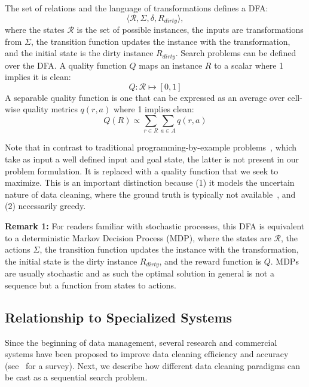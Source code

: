 The set of relations and the language of transformations defines a DFA:
\[\langle \mathcal{R}, \Sigma, \delta, R_{dirty}\rangle, \]
where the states $\mathcal{R}$ is the set of possible instances, the inputs are transformations from $\Sigma$, the transition function updates the instance with the transformation, and the initial state is the dirty instance $R_{dirty}$. Search problems can be defined over the DFA. 
A quality function $Q$ maps an instance $R$ to a scalar where 1 implies it is clean:
\[
Q: \mathcal{R} \mapsto [0,1]
\]
A separable quality function is one that can be expressed as an average over cell-wise quality metrics $q(r,a)$ where 1 implies clean:
\[
Q(R) \propto \sum_{r \in R} \sum_{a \in A} q(r,a)
\]

Note that in contrast to traditional programming-by-example problems~\cite{}, which take as input a well defined input and goal state, the latter is not present in our problem formulation.  It is replaced with a quality function that we seek to maximize.  This is an important distinction because (1) it models the uncertain nature of data cleaning, where the ground truth is typically not available~\cite{}, and (2) necessarily greedy.

\vspace{0.5em} \noindent \textbf{Remark 1: } For readers familiar with stochastic processes, this DFA is equivalent to a deterministic Markov Decision Process (MDP), where the states are $\mathcal{R}$, the actions $\Sigma$, the transition function updates the instance with the transformation, the initial state is the dirty instance $R_{dirty}$, and the reward function is $Q$. MDPs are usually stochastic and as such the optimal solution in general is not a sequence but a function from states to actions.



\fi

\subsection{Relationship to Specialized Systems}
Since the beginning of data management, several research and commercial systems have been proposed to improve data cleaning efficiency and accuracy (see~\cite{rahm2000data} for a survey).
Next, we describe how different data cleaning paradigms can be cast as a sequential search problem.

